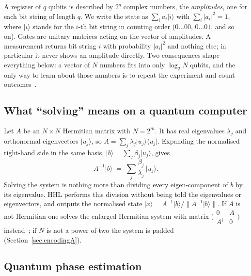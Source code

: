 \documentclass[manuscript,screen,review,nonacm]{acmart}
\newcommand{\ket}[1]{\lvert #1\rangle}
\newcommand{\bra}[1]{\langle #1\rvert}
\newcommand{\norm}[1]{\lVert #1\rVert}
\begin{document}
A register of $q$ qubits is described by $2^q$ complex numbers, the
\emph{amplitudes}, one for each bit string of length $q$. We write the state
as $\sum_i a_i\ket{i}$ with $\sum_i |a_i|^2=1$, where $\ket{i}$ stands for the
$i$-th bit string in counting order ($0\dots00$, $0\dots01$, and so on). Gates
are unitary matrices acting on the vector of amplitudes. A measurement returns
bit string $i$ with probability $|a_i|^2$ and nothing else; in particular it
never shows an amplitude directly. Two consequences shape everything below:
a vector of $N$ numbers fits into only $\log_2 N$ qubits, and the only way to
learn about those numbers is to repeat the experiment and count
outcomes~\cite{nielsen2010}.

\subsection{What ``solving'' means on a quantum computer}

Let $A$ be an $N\times N$ Hermitian matrix with $N=2^m$. It has real
eigenvalues $\lambda_j$ and orthonormal eigenvectors $\ket{u_j}$, so
$A=\sum_j \lambda_j \ket{u_j}\bra{u_j}$. Expanding the normalised right-hand
side in the same basis, $\ket{b}=\sum_j\beta_j\ket{u_j}$, gives
\begin{equation}
  A^{-1}\ket{b} \;=\; \sum_j \frac{\beta_j}{\lambda_j}\,\ket{u_j}.
  \label{eq:inverse}
\end{equation}
Solving the system is nothing more than dividing every eigen-component of $b$
by its eigenvalue. HHL performs this division without being told the
eigenvalues or eigenvectors, and outputs the normalised state
$\ket{x}=A^{-1}\ket{b}/\norm{A^{-1}\ket{b}}$. If $A$ is not Hermitian one
solves the enlarged Hermitian system with matrix
$\bigl(\begin{smallmatrix}0&A\\A^\dagger&0\end{smallmatrix}\bigr)$
instead~\cite{harrow2009}; if $N$ is not a power of two the system is padded
(Section~\ref{sec:encodingA}).

\subsection{Quantum phase estimation}
\label{sec:qpe}
\end{document}
